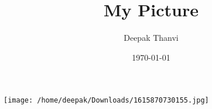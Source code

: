 \documentclass{article}
\title{My Picture}
\author{Deepak Thanvi}
\date{\today}
\begin{document}
\maketitle

\begin{center}
	\texttt{[image: /home/deepak/Downloads/1615870730155.jpg]}
\end{center}
\end{document}
